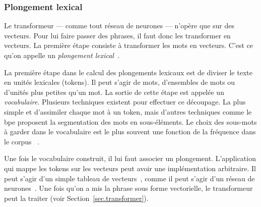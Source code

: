 \subsubsection{Plongement lexical}

Le transformeur --- comme tout réseau de neurones --- n'opère que sur des vecteurs.
Pour lui faire passer des phrases, il faut donc les transformer en vecteurs.
La première étape consiste à transformer les mots en vecteurs.
C'est ce qu'on appelle un \emph{plongement lexical}~\cite{Almeida_Xexéo_2019}.

La première étape dans le calcul des plongements lexicaux est de diviser le texte en unités lexicales (tokens).
Il peut s'agir de mots, d'ensembles de mots ou d'unités plus petites qu'un mot.
La sortie de cette étape est appelée un \emph{vocabulaire}.
Plusieurs techniques existent pour effectuer ce découpage. 
La plus simple et d'assimiler chaque mot à un token,
mais d'autres techniques comme le \gls{bpe} proposent la segmentation des mots en sous-éléments.
Le choix des sous-mots à garder dans le vocabulaire est le plus souvent une fonction de la fréquence dans le corpus%
~\cite{Rai_Borah_2021}.

Une fois le vocabulaire construit, il lui faut associer un plongement.
L'application qui mappe les tokens sur les vecteurs peut avoir une implémentation arbitraire.
Il peut s'agir d'un simple tableau de vecteurs~\cite{Paszke_et_al_2019},
comme il peut s'agir d'un réseau de neurones~\cite{Church_2017}.
Une fois qu'on a mis la phrase sous forme vectorielle,
le transformeur peut la traiter (voir Section~\ref{sec.transformer}).